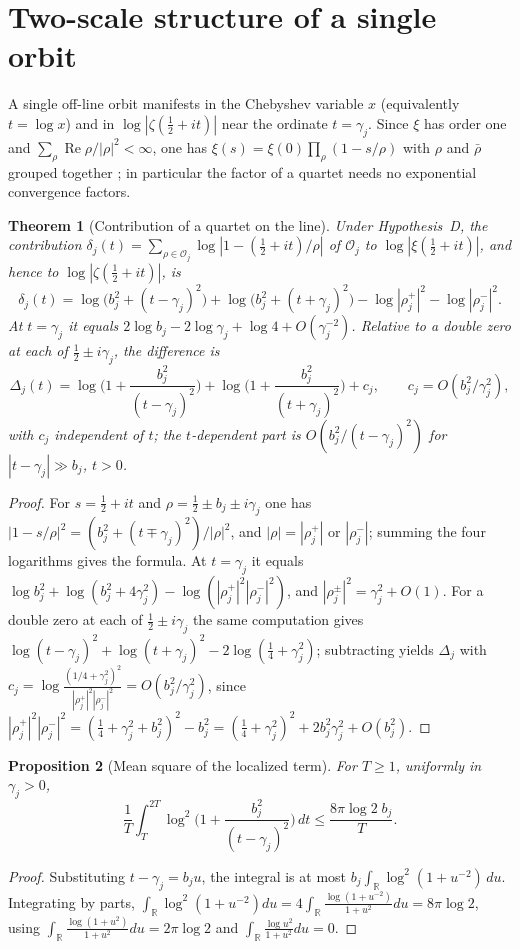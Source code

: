 \documentclass[11pt]{amsart}
\newtheorem{theorem}{Theorem}[section]
\newtheorem{proposition}[theorem]{Proposition}
\theoremstyle{definition}
\theoremstyle{remark}
\renewcommand{\Re}{\operatorname{Re}}
\newcommand{\half}{\tfrac12}
\begin{document}
\section{Two-scale structure of a single orbit}\label{sec:twoscale}

A single off-line orbit manifests in the Chebyshev variable $x$ (equivalently $t=\log x$) and in
$\log|\zeta(\half+it)|$ near the ordinate $t=\gamma_j$. Since $\xi$ has order one and
$\sum_\rho\Re\rho/|\rho|^2<\infty$, one has $\xi(s)=\xi(0)\prod_\rho(1-s/\rho)$ with $\rho$
and $\bar\rho$ grouped together \cite[Ch.~12]{Davenport}; in particular the factor of a quartet
needs no exponential convergence factors.

\begin{theorem}[Contribution of a quartet on the line]\label{thm:depression}
Under Hypothesis~D, the contribution
$\delta_j(t)=\sum_{\rho\in\mathcal O_j}\log|1-(\half+it)/\rho|$ of $\mathcal O_j$ to
$\log|\xi(\half+it)|$, and hence to $\log|\zeta(\half+it)|$, is
\[
\delta_j(t)=\log\!\big(b_j^2+(t-\gamma_j)^2\big)+\log\!\big(b_j^2+
(t+\gamma_j)^2\big)-\log|\rho_j^+|^2-\log|\rho_j^-|^2 .
\]
At $t=\gamma_j$ it equals $2\log b_j-2\log\gamma_j+\log4+O(\gamma_j^{-2})$. Relative to a double
zero at each of $\half\pm i\gamma_j$, the difference is
\[
\Delta_j(t)=\log\Big(1+\frac{b_j^2}{(t-\gamma_j)^2}\Big)+\log\Big(1+\frac{b_j^2}{(t+\gamma_j)^2}\Big)
+c_j,\qquad c_j=O(b_j^2/\gamma_j^2),
\]
with $c_j$ independent of $t$; the $t$-dependent part is $O(b_j^2/(t-\gamma_j)^2)$ for
$|t-\gamma_j|\gg b_j$, $t>0$.
\end{theorem}
\begin{proof}
For $s=\half+it$ and $\rho=\half\pm b_j\pm i\gamma_j$ one has
$|1-s/\rho|^2=(b_j^2+(t\mp\gamma_j)^2)/|\rho|^2$, and $|\rho|=|\rho_j^+|$ or $|\rho_j^-|$;
summing the four logarithms gives the formula. At $t=\gamma_j$ it equals
$\log b_j^2+\log(b_j^2+4\gamma_j^2)-\log(|\rho_j^+|^2|\rho_j^-|^2)$, and
$|\rho_j^\pm|^2=\gamma_j^2+O(1)$. For a double zero at each of $\half\pm i\gamma_j$ the same
computation gives $\log(t-\gamma_j)^2+\log(t+\gamma_j)^2-2\log(\tfrac14+\gamma_j^2)$;
subtracting yields $\Delta_j$ with
$c_j=\log\frac{(1/4+\gamma_j^2)^2}{|\rho_j^+|^2|\rho_j^-|^2}=O(b_j^2/\gamma_j^2)$, since
$|\rho_j^+|^2|\rho_j^-|^2=(\tfrac14+\gamma_j^2+b_j^2)^2-b_j^2=(\tfrac14+\gamma_j^2)^2+
2b_j^2\gamma_j^2+O(b_j^2)$.
\end{proof}

\begin{proposition}[Mean square of the localized term]\label{prop:cesaro}
For $T\ge1$, uniformly in $\gamma_j>0$,
\[
\frac1T\int_T^{2T}\log^2\Big(1+\frac{b_j^2}{(t-\gamma_j)^2}\Big)\,dt\le\frac{8\pi\log2\;b_j}{T}.
\]
\end{proposition}
\begin{proof}
Substituting $t-\gamma_j=b_ju$, the integral is at most
$b_j\int_{\mathbb R}\log^2(1+u^{-2})\,du$. Integrating by parts,
$\int_{\mathbb R}\log^2(1+u^{-2})du=4\int_{\mathbb R}\frac{\log(1+u^{-2})}{1+u^2}du
=8\pi\log2$, using $\int_{\mathbb R}\frac{\log(1+u^2)}{1+u^2}du=2\pi\log2$ and
$\int_{\mathbb R}\frac{\log u^2}{1+u^2}du=0$.
\end{proof}
\end{document}
